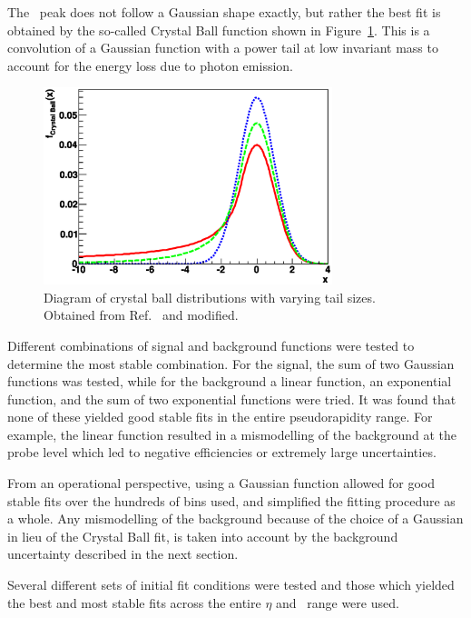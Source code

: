 The \jpsi\ peak does not follow a Gaussian shape exactly, but rather the best fit is obtained by the so-called Crystal Ball function shown in Figure~\ref{fig:CalibrationCBDist}. This is a convolution of a Gaussian function with a power tail at low invariant mass to account for the energy loss due to photon emission.

\begin{figure}[htbp]
  \centering
  \includegraphics[width=0.75\textwidth]{PartCalibration2012/Plots/CrystalBallFunction.eps}
  \caption[Diagram of crystal ball distributions with varying tail sizes.]{Diagram of crystal ball distributions with varying tail sizes. Obtained from Ref.~\cite{Calibration:CBFunction} and modified.}
  \label{fig:CalibrationCBDist}
\end{figure}

Different combinations of signal and background functions were tested to determine the most stable combination. For the signal, the sum of two Gaussian functions was tested, while for the background a linear function, an exponential function, and the sum of two exponential functions were tried. It was found that none of these yielded good stable fits in the entire pseudorapidity range. For example, the linear function resulted in a mismodelling of the background at the probe level which led to negative efficiencies or extremely large uncertainties. 

From an operational perspective, using a Gaussian function allowed for good stable fits over the hundreds of bins used, and simplified the fitting procedure as a whole. Any mismodelling of the background because of the choice of a Gaussian in lieu of the Crystal Ball fit, is taken into account by the background uncertainty described in the next section.

Several different sets of initial fit conditions were tested and those which yielded the best and most stable fits across the entire $\eta$ and \pt\ range were used. 

